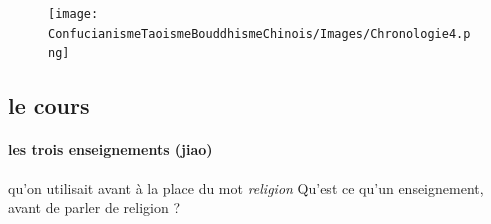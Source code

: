 \begin{figure}[!h]
    \centering
\texttt{[image: ConfucianismeTaoismeBouddhismeChinois/Images/Chronologie4.png]}
    \label{fig:enter-label}
\end{figure}

\subsection{le cours}

\paragraph{les trois enseignements (jiao)} qu'on utilisait avant à la place du mot \textit{religion}
Qu'est ce qu'un enseignement, avant de parler de religion ?





